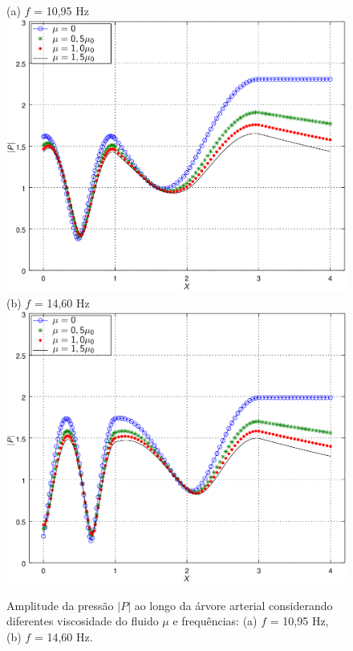 \documentclass[
        english,			
        brazil			        %
        ,<...>]{abntbibufjf}
\begin{document}
\begin{figure}[!htbp]
	\centering
	(a) $f$ = 10,95 Hz\\
\includegraphics[scale=0.7]{figure3-result-new/fig3_P_f10_95_visc_new2.png}\\
	(b) $f$ = 14,60 Hz\\
	\includegraphics[scale=0.7]{figure3-result-new/fig3_P_f14_60_visc_new2.png}\\
	\caption{Amplitude da pressão $|P|$ ao longo da árvore arterial considerando diferentes viscosidade do fluido $\mu$ e frequências: (a) $f$ = 10,95 Hz, (b)  $f$ = 14,60 Hz. }
	\label{fig3b:arterial-tree}%
\end{figure}
\end{document}

